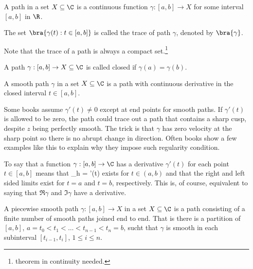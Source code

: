 \begin{definition}[path]\label{def:path_complex}%
A path in a set $X\subseteq \C$ is a continuous function $\gamma: [a,b]\to X$ for some interval $[a,b]$ in $\R$.

The set $\bra{\gamma(t): t\in [a,b]}$ is called the trace of path $\gamma$, denoted by $\bra{\gamma}$.
\end{definition}

\begin{remark}
Note that the trace of a path is always a compact set.\footnote{theorem in continuity needed.}
\end{remark}

\begin{definition}
A path $\gamma:[a,b]\to X\subseteq \C$ is called closed if $\gamma(a) = \gamma(b)$.
\end{definition}

\begin{definition}\label{def:smooth_path_complex}%
A smooth path $\gamma$ in a set $X\subseteq \C$ is a path with continuous derivative in the closed interval $t\in [a,b]$.%
\end{definition}

\begin{remark}
Some books assume $\gamma'(t)\neq 0$ except at end points for smooth paths. If $\gamma'(t)$ is allowed to be zero, the path could trace out a path that contains a sharp cusp, despite $z$ being perfectly smooth. The trick is that $\gamma$ has zero velocity at the sharp point so there is no abrupt change in direction. Often books show a few examples like this to explain why they impose such regularity condition.
\end{remark}

\begin{remark}
To say that a function $\gamma:[a,b]\to \C$ has a derivative $\gamma'(t)$ for each point $t\in [a,b]$ means that
\be
\lim_{h} = \gamma'(t)
\ee
exists for $t\in(a,b)$ and that the right and left sided limits exist for $t=a$ and $t=b$, respectively. This is, of course, equivalent to saying that $\Re\gamma$ and $\Im\gamma$ have a derivative.
\end{remark}



\begin{definition}\label{def:piecewise_smooth_path_complex}%
A piecewise smooth path $\gamma:[a,b]\to X$ in a set $X\subseteq \C$ is a path consisting of a finite number of smooth paths joined end to end. That is there is a partition of $[a,b]$, $a= t_0 < t_1 <\dots < t_{n-1}< t_n = b$, sucht that $\gamma$ is smooth in each subinterval $[t_{i-1},t_{i}]$, $1\leq i \leq n$.
\end{definition}


